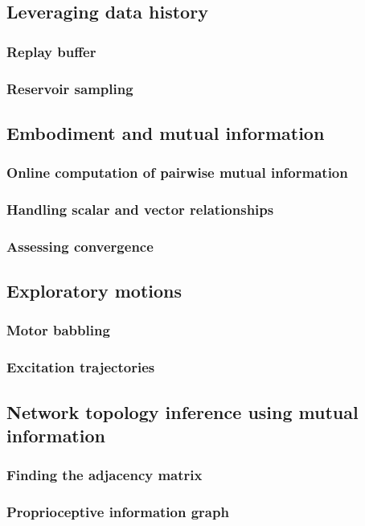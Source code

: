 \documentclass{article}
\begin{document}
\subsection{Leveraging data history}
\subsubsection{Replay buffer}
\subsubsection{Reservoir sampling}
\subsection{Embodiment and mutual information}
\subsubsection{Online computation of pairwise mutual information}
\subsubsection{Handling scalar and vector relationships}
\subsubsection{Assessing convergence}
\subsection{Exploratory motions}
\subsubsection{Motor babbling}
\subsubsection{Excitation trajectories}
\subsection{Network topology inference using mutual information}
\subsubsection{Finding the adjacency matrix}
\subsubsection{Proprioceptive information graph}
\end{document}
